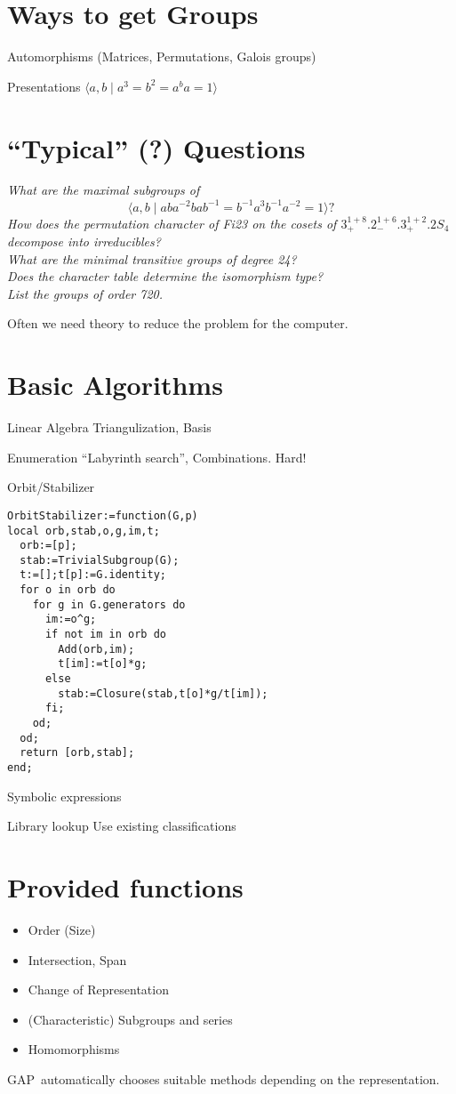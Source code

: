 \documentclass{article}
\newcommand\gen[1]{\langle#1\rangle}
\newcommand\GAP{{\sf GAP}}
\newcommand{\entrylabel}[1]{\mbox{#1}\hfil}
\def\Abschnitt#1{\section*{{\huge\bf #1}}}
\newenvironment{entry}
{\begin{list}{}%
{\renewcommand{\makelabel}{\entrylabel}%
\setlength{\labelwidth}{45mm}%
\setlength{\leftmargin}{50mm}%
}%
}%
{\end{list}}
\begin{document}
\Abschnitt{Ways to get Groups}
\noindent
\begin{entry}
\item[Automorphisms]
(Matrices, Permutations, Galois groups)
\item[Presentations]
$\gen{a,b\mid a^3=b^2=a^ba=1}$
\end{entry}

\Abschnitt{``Typical'' (?) Questions}
\noindent
{\sl
What are the maximal subgroups of 
\[
\gen{a,b\mid aba^{-2}bab^{-1}=b^{-1}a^3b^{-1}a^{-2}=1}?
\]
How does the permutation character of Fi23 on the cosets of 
$3_{+}^{1+8}.2_{-}^{1+6}.3_{+}^{1+2}.2S_4$ decompose into
irreducibles?\\
What are the minimal transitive groups of degree 24?\\
Does the character table determine the isomorphism type?\\
List the groups of order 720.\\
}

Often we need theory to reduce the problem for the computer.

\newpage\noindent
\Abschnitt{Basic Algorithms}
\noindent
\begin{entry}
\item[Linear Algebra] Triangulization, Basis
\item[Enumeration] ``Labyrinth search'', Combinations. Hard!
\item[Orbit/Stabilizer]
\begin{verbatim}
OrbitStabilizer:=function(G,p)
local orb,stab,o,g,im,t;
  orb:=[p];
  stab:=TrivialSubgroup(G);
  t:=[];t[p]:=G.identity;
  for o in orb do
    for g in G.generators do
      im:=o^g;
      if not im in orb do
        Add(orb,im);
        t[im]:=t[o]*g;
      else
        stab:=Closure(stab,t[o]*g/t[im]);
      fi;
    od;
  od;
  return [orb,stab];
end;
\end{verbatim}
\item[]
\item[Symbolic expressions]
\item[Library lookup]Use existing classifications
\end{entry}

\newpage
\Abschnitt{Provided functions}
\noindent
\begin{itemize}
\item Order (Size)
\item Intersection, Span
\item Change of Representation
\item (Characteristic) Subgroups and series
\item Homomorphisms
\end{itemize}
\GAP\ automatically chooses suitable methods depending on the representation.
\end{document}
